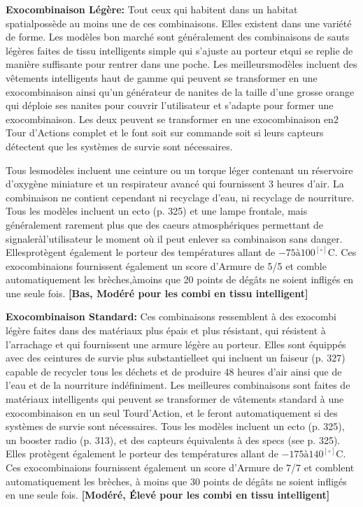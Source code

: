 \textbf{Exocombinaison Légère:} Tout ceux qui habitent dans un habitat spatialpossède au moins une de ces combinaisons. Elles existent dans une variété de forme. Les modèles bon marché sont généralement des combinaisons de sauts légères faites de tissu intelligents simple qui s'ajuste au porteur etqui se replie de manière suffisante pour rentrer dans une poche. Les meilleursmodèles incluent des vêtements intelligents haut de gamme qui peuvent se transformer en une exocombinaison ainsi qu'un générateur de nanites de la taille d'une grosse orange qui déploie ses nanites pour couvrir l'utilisateur et s'adapte pour former une exocombinaison. Les deux peuvent se transformer en une exocombinaison en2 Tour d'Actions complet et le font soit sur commande soit si leurs capteurs détectent que les systèmes de survie sont nécessaires. 

Tous lesmodèles incluent une ceinture ou un torque léger contenant un réservoire d'oxygène miniature et un respirateur avancé qui fournissent 3 heures d'air. La combinaison ne contient cependant ni recyclage d'eau, ni recyclage de nourriture. Tous les modèles incluent un ecto (p. 325) et une lampe frontale, mais généralement rarement plus que des caeurs atmosphériques permettant de signaleràl'utilisateur le moment où il peut enlever sa combinaison sans danger. Ellesprotègent également le porteur des températures allant de $-75 à 100^[\circ]$C. Ces exocombinaions fournissent également un score d'Armure de 5/5 et comble automatiquement les brèches,àmoins que 20 points de dégâts ne soient infligés en une seule fois. \textbf{[Bas, Modéré pour les combi en tissu intelligent]} 

\textbf{Exocombinaison Standard:} Ces combinaisons ressemblent à des exocombi légère faites dans des matériaux plus épais et plus résistant, qui résistent à l'arrachage et qui fournissent une armure légère au porteur. Elles sont équippés avec des ceintures de survie plus substantielleet qui incluent un faiseur (p. 327) capable de recycler tous les déchets et de produire 48 heures d'air ainsi que de l'eau et de la nourriture indéfiniment. Les meilleures combinaisons sont faites de matériaux intelligents qui peuvent se transformer de vâtements standard à une exocombinaison en un seul Tourd'Action, et le feront automatiquement si des systèmes de survie sont nécessaires. Tous les modèles incluent un ecto (p. 325), un booster radio (p. 313), et des capteurs équivalents à des specs (see p. 325). Elles protègent également le porteur des températures allant de $-175 à 140^[\circ]$C. Ces exocombinaions fournissent également un score d'Armure de 7/7 et comblent automatiquement les brèches, à moins que 30 points de dégâts ne soient infligés en une seule fois. \textbf{[Modéré, Élevé pour les combi en tissu intelligent]} 

